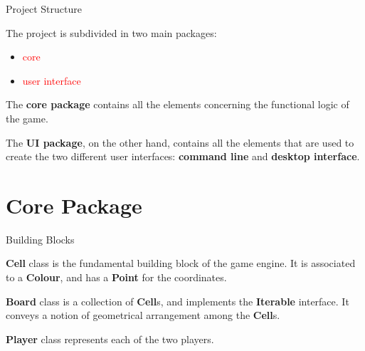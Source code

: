\documentclass{beamer}
\begin{document}
  \begin{frame}{Project Structure}

    The project is subdivided in two main packages:

    \begin{itemize}
      \item \textcolor{red}{core}
      \item \textcolor{red}{user interface}
    \end{itemize}

    \pause

    \vspace{1em}

    The \textbf{core package} contains all the elements concerning the functional logic of the game.

    \pause

    \vspace{1em}

    The \textbf{UI package}, on the other hand, contains all the elements that are used to create the two different user interfaces: \textbf{command line} and \textbf{desktop interface}.

  \end{frame}



\section{Core Package}

  \begin{frame}{Building Blocks}

    \textbf{Cell} class is the fundamental building block of the game engine. It is associated to a \textbf{Colour}, and has a \textbf{Point} for the coordinates.

    \vspace{1em}

    \textbf{Board} class is a collection of \textbf{Cell}s, and implements the \textbf{Iterable} interface. It conveys a notion of geometrical arrangement among the \textbf{Cell}s.

    \vspace{1em}

    \textbf{Player} class represents each of the two players.

  \end{frame}
\end{document}
